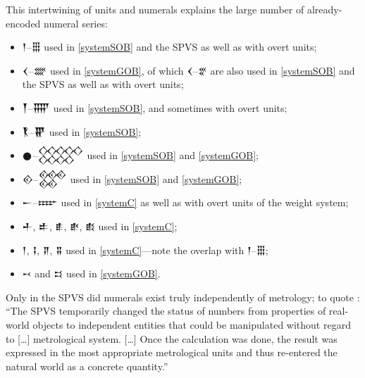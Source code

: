 \documentclass[10pt, a4paper, twoside]{article}
\begin{document}
This intertwining of units and numerals explains the large number of already-encoded numeral series:
\begin{itemize}[nosep]
\item {\xsuxfont 𒁹}–{\xsuxfont 𒑆} used in \ref{systemSOB} and the SPVS as well as with overt units;
\item {\xsuxfont 𒌋}–{\xsuxfont 𒐔} used in \ref{systemGOB}, of which {\xsuxfont 𒌋}–{\xsuxfont 𒐐} are also used in \ref{systemSOB} and the SPVS as well as with overt units;
\item {\xsuxfont 𒐕}–{\xsuxfont 𒐝} used in \ref{systemSOB}, and sometimes with overt units;
\item {\xsuxfont 𒐞}–{\xsuxfont 𒐢} used in \ref{systemSOB};
\item {\xsuxfont 𒊹}–{\xsuxfont 𒐫} used in \ref{systemSOB} and \ref{systemGOB};
\item {\xsuxfont 𒐬}–{\xsuxfont 𒐱} used in \ref{systemSOB} and \ref{systemGOB};
\item {\xsuxfont 𒀸}–{\xsuxfont 𒐇} used in \ref{systemC} as well as with overt units of the weight system;
\item {\xsuxfont 𒑏}, {\xsuxfont 𒑐}, {\xsuxfont 𒑑}, {\xsuxfont 𒑒}, {\xsuxfont 𒑔} used in \ref{systemC};
\item {\xsuxfont 𒁹}, {\xsuxfont 𒑖}, {\xsuxfont 𒑗}, {\xsuxfont 𒐉} used in \ref{systemC}—note the overlap with {\xsuxfont 𒁹}–{\xsuxfont 𒑆};
\item {\xsuxfont 𒑘} and 	{\xsuxfont 𒑙} used in \ref{systemGOB}.
\end{itemize}
Only in the SPVS did numerals exist truly independently of metrology; to quote \cite[78]{Robson2008}:
``The SPVS temporarily changed the status of numbers from properties of real-world objects to independent entities that could be manipulated without regard to […] metrological system. […] Once the calculation was done, the result was expressed in the most appropriate metrological units and thus re-entered the natural world as a concrete quantity.''
\end{document}
